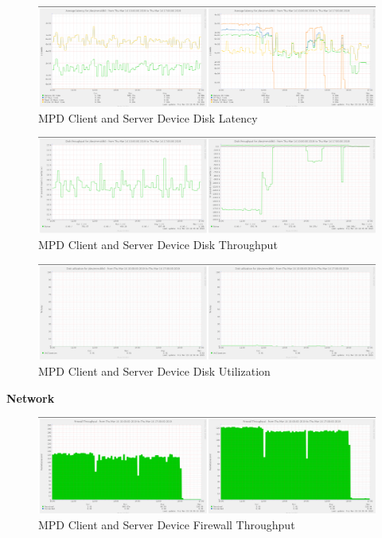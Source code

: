 \documentclass[11pt,a4paper,headinclude=false,footinclude=false]{scrreprt}
\begin{document}
\begin{figure}[H]
\includegraphics{ResultsAndAnalysis/MPDServerTestImages/006MPDDiskLatency.png}
\centering
\caption{MPD Client and Server Device Disk Latency}
\label{MPDDiskLatency}
\end{figure}

\begin{figure}[H]
\includegraphics{ResultsAndAnalysis/MPDServerTestImages/007MPDDiskThroughput.png}
\centering
\caption{MPD Client and Server Device Disk Throughput}
\label{MPDDiskThroughput}
\end{figure}

\begin{figure}[H]
\includegraphics{ResultsAndAnalysis/MPDServerTestImages/008MPDDiskUtilization.png}
\centering
\caption{MPD Client and Server Device Disk Utilization}
\label{MPDDiskUtil}
\end{figure}

\textbf{Network}

\begin{figure}[H]
\includegraphics{ResultsAndAnalysis/MPDServerTestImages/011MPDFirewallThroughput.png}
\centering
\caption{MPD Client and Server Device Firewall Throughput}
\label{MPDFirewallThroughput}
\end{figure}
\end{document}
